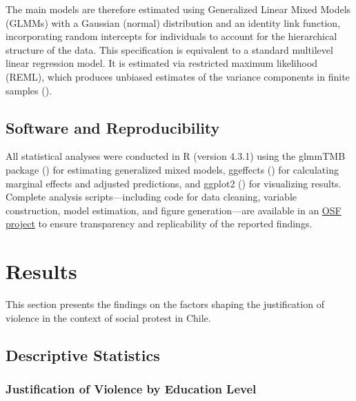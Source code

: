 \documentclass[
  13pt,
]{article}
\begin{document}
The main models are therefore estimated using Generalized Linear Mixed
Models (GLMMs) with a Gaussian (normal) distribution and an identity
link function, incorporating random intercepts for individuals to
account for the hierarchical structure of the data. This specification
is equivalent to a standard multilevel linear regression model. It is
estimated via restricted maximum likelihood (REML), which produces
unbiased estimates of the variance components in finite samples
().

\subsection{Software and
Reproducibility}\label{software-and-reproducibility}

All statistical analyses were conducted in R (version 4.3.1) using the
glmmTMB package () for estimating generalized mixed models, ggeffects
() for calculating
marginal effects and adjusted predictions, and ggplot2
() for visualizing
results. Complete analysis scripts---including code for data cleaning,
variable construction, model estimation, and figure generation---are
available in an
\href{https://osf.io/ybuz5/overview?view_only=469f99b4bac841eeb344b3ce049e50b8}{OSF
project} to ensure transparency and replicability of the reported
findings.

\section{Results}\label{results}

This section presents the findings on the factors shaping the
justification of violence in the context of social protest in Chile.

\subsection{Descriptive Statistics}\label{descriptive-statistics}

\subsubsection{Justification of Violence by Education
Level}\label{justification-of-violence-by-education-level}
\end{document}
